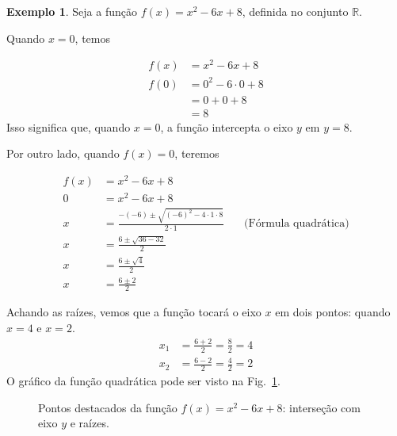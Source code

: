 \documentclass[12pt,openright,twoside,a4paper]{article}
\theoremstyle{definition}
\newtheorem{example}{Exemplo}[section]
\begin{document}
	\begin{example}\label{ex:f_x2-6x+8}
		Seja a função $f(x) = x^2 -6x + 8$, definida no conjunto $\mathbb{R}$.
		
		Quando $x=0$, temos 
		
		\begin{align*}
			f(x) &= x^2 -6x + 8 \\
			f(0) &=  0^2 -6 \cdot 0 + 8 \\
			&= 0 + 0 + 8 \\
			&= 8
		\end{align*}
		Isso significa que, quando $x=0$, a função intercepta o eixo $y$ em $y=8$.
		
		Por outro lado, quando $f(x) = 0$, teremos
		
		\begin{align*}
			f(x) &= x^2 -6x + 8 \\
			0 &= x^2 -6x + 8 \\
			x &= \frac{-(-6) \pm \sqrt{(-6)^2 - 4 \cdot 1 \cdot 8}}{2 \cdot 1} \quad &\text{(Fórmula quadrática)}\\
			x &= \frac{6 \pm \sqrt{36 - 32}}{2} \\
			x &= \frac{6 \pm \sqrt{4}}{2} \\
			x &= \frac{6 \pm 2}{2}
		\end{align*}
		
		Achando as raízes, vemos que a função tocará o eixo $x$ em dois pontos: quando $x=4$ e $x=2$.
		\begin{align*}
			x_1 &= \frac{6 + 2}{2} = \frac{8}{2} = 4 \\
			x_2 &= \frac{6 - 2}{2} = \frac{4}{2} = 2
		\end{align*}
		O gráfico da função quadrática pode ser visto na Fig.~\ref{fig:pontos-funcao-quadratica}.
		
		\begin{figure}[h]
			\centering
			\caption{Pontos destacados da função $f(x) = x^2 - 6x + 8$: interseção com eixo $y$ e raízes.}
			\label{fig:pontos-funcao-quadratica}
		\end{figure}
	\end{example}
	
\end{document}
